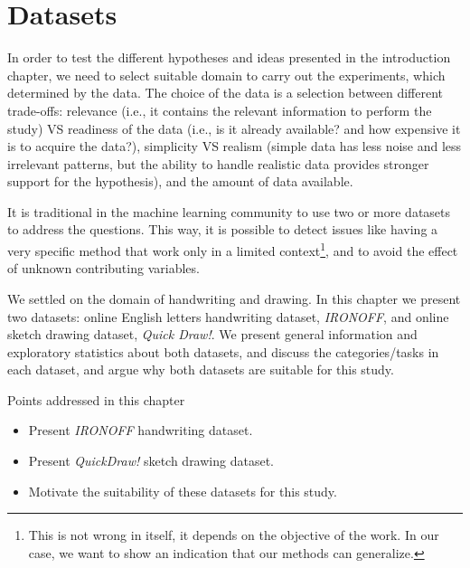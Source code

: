 \chapter{Datasets} \label{ch:dataset}
\minitoc%

\par In order to test the different hypotheses and ideas presented in the introduction chapter, we need to select suitable domain to carry out the experiments, which determined by the data. The choice of the data is a selection between different trade-offs: relevance (i.e., it contains the relevant information to perform the study) VS readiness of the data (i.e., is it already available? and how expensive it is to acquire the data?), simplicity VS realism (simple data has less noise and less irrelevant patterns, but the ability to handle realistic data provides stronger support for the hypothesis), and the amount of data available.

\par It is traditional in the machine learning community to use two or more datasets to address the questions. This way, it is possible to detect issues like having a very specific method that work only in a limited context\footnote{This is not wrong in itself, it depends on the objective of the work. In our case, we want to show an indication that our methods can generalize.}, and to avoid the effect of unknown contributing variables.

\par We settled on the domain of handwriting and drawing. In this chapter we present two datasets: online English letters handwriting dataset, \textit{IRONOFF}, and online sketch drawing dataset, \textit{Quick Draw!}. We present general information and exploratory statistics about both datasets, and discuss the categories/tasks in each dataset, and argue why both datasets are suitable for this study.

\begin{mdframed}[backgroundcolor=blue!20]
    \begin{center}
        Points addressed in this chapter
    \end{center}

    \begin{itemize}[noitemsep]
        \item Present \textit{IRONOFF} handwriting dataset.
        \item Present \textit{QuickDraw!} sketch drawing dataset.
        \item Motivate the suitability of these datasets for this study.
    \end{itemize}
\end{mdframed}

